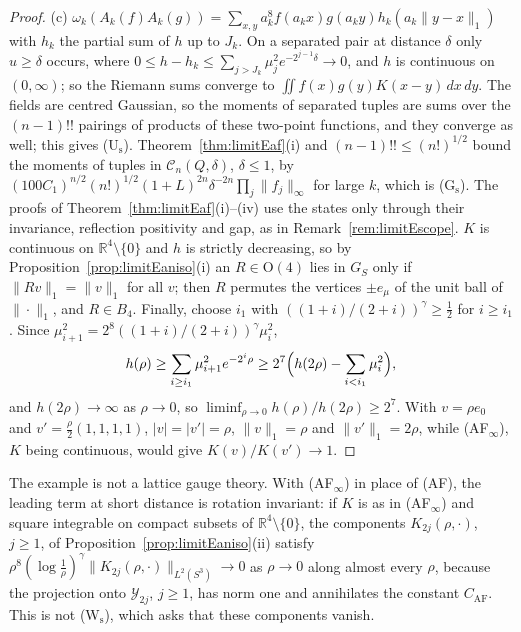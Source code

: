 \documentclass[aps,prd,twocolumn,superscriptaddress,nofootinbib,longbibliography,floatfix,amsmath,amssymb,10pt]{revtex4-2}
\theoremstyle{definition}
\theoremstyle{remark}
\newcommand{\R}{\mathbb{R}}
\begin{document}
\begin{proof}
(c) $\omega_k(A_k(f)A_k(g))=\sum_{x,y}a_k^8f(a_kx)g(a_ky)h_k(a_k\|y-x\|_1)$
with $h_k$ the partial sum of $h$ up to $J_k$. On a separated pair at
distance $\delta$ only $u\ge\delta$ occurs, where $0\le h-h_k\le\sum_{j>J_k}
\mu_j^2e^{-2^{j-1}\delta}\to0$, and $h$ is continuous on $(0,\infty)$; so
the Riemann sums converge to $\iint f(x)g(y)K(x-y)\,dx\,dy$. The fields are
centred Gaussian, so the moments of separated tuples are sums over the
$(n-1)!!$ pairings of products of these two-point functions, and they
converge as well; this gives (U$_{\mathrm s}$). Theorem~\ref{thm:limitEaf}(i)
and $(n-1)!!\le(n!)^{1/2}$ bound the moments of tuples in $\mathcal
C_n(Q,\delta)$, $\delta\le1$, by $(100C_1)^{n/2}(n!)^{1/2}(1+L)^{2n}
\delta^{-2n}\prod_j\|f_j\|_\infty$ for large $k$, which is
(G$_{\mathrm s}$). The proofs of Theorem~\ref{thm:limitEaf}(i)--(iv) use
the states only through their invariance, reflection positivity and gap, as
in Remark~\ref{rem:limitEscope}. $K$ is continuous on $\R^4\setminus\{0\}$ and
$h$ is strictly decreasing, so by Proposition~\ref{prop:limitEaniso}(i) an
$R\in\mathrm O(4)$ lies in $G_S$ only if $\|Rv\|_1=\|v\|_1$ for all $v$; then
$R$ permutes the vertices $\pm e_\mu$ of the unit ball of $\|\cdot\|_1$, and
$R\in B_4$. Finally, choose $i_1$ with $((1+i)/(2+i))^\gamma\ge\frac12$ for
$i\ge i_1$. Since $\mu_{i+1}^2=2^8((1+i)/(2+i))^\gamma\mu_i^2$,
\[
h(\rho)\ge\sum_{i\ge i_1}\mu_{i+1}^2e^{-2^i\rho}\ge2^7\Bigl(h(2\rho)-
\sum_{i<i_1}\mu_i^2\Bigr),
\]
and $h(2\rho)\to\infty$ as $\rho\to0$, so $\liminf_{\rho\to0}h(\rho)/
h(2\rho)\ge2^7$. With $v=\rho e_0$ and $v'=\frac\rho2(1,1,1,1)$, $|v|=|v'|=
\rho$, $\|v\|_1=\rho$ and $\|v'\|_1=2\rho$, while (AF$_\infty$), $K$ being
continuous, would give $K(v)/K(v')\to1$.
\end{proof}

The example is not a lattice gauge theory. With (AF$_\infty$) in place of
(AF), the leading term at short distance is rotation invariant: if $K$ is
as in (AF$_\infty$) and square integrable on compact subsets of $\R^4
\setminus\{0\}$, the components $K_{2j}(\rho,\cdot)$, $j\ge1$, of
Proposition~\ref{prop:limitEaniso}(ii) satisfy $\rho^8(\log\frac1\rho)
^\gamma\|K_{2j}(\rho,\cdot)\|_{L^2(S^3)}\to0$ as $\rho\to0$ along almost every
$\rho$, because the projection onto $\mathcal Y_{2j}$, $j\ge1$, has norm one
and annihilates the constant $C_{\mathrm{AF}}$. This is not
(W$_{\mathrm s}$), which asks that these components vanish.
\end{document}
